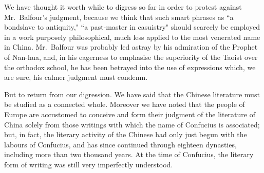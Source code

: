 We have thought it worth while  to digress so far in order to protest against Mr.~Balfour's judgment, because we think that such smart phrases as ``a bondslave to antiquity," ``a past-master in casuistry" should scarcely be employed in a work purposely philosophical, much less applied to the most venerated name in China.
Mr.~Balfour was probably led astray by his admiration of the Prophet of Nan-hua, and, in his eagerness to emphasise the superiority of the Taoist over the orthodox school, he has been betrayed into the use of expressions which, we are sure, his calmer judgment must condemn.

But to return from our digression. 
We have said that the Chinese literature must be studied as a connected whole.
Moreover we have noted that the people of Europe are accustomed to conceive and form their judgment of the literature of China solely from those writings with which the name of Confucius is associated; but, in fact, the literary activity of the Chinese had only just begun with the labours of Confucius, and has since continued through eighteen dynasties, including more than two thousand years.
At the time of Confucius, the literary form of writing was still very imperfectly understood.

